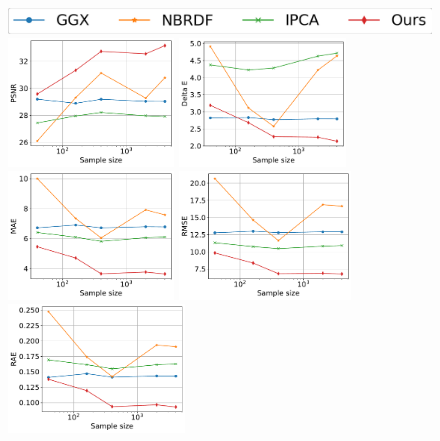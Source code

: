 \begin{figure}[t]
   \label{fig:imp_comp_upt}
\end{figure}

\begin{figure}[t]
  \centering
    {\includegraphics[width=0.35\linewidth]{Chapters/hyperbrdf-figs/legend.png}}\\
  {\includegraphics[width=0.32\linewidth, height=3.4cm]{Chapters/hyperbrdf-figs/PSNR_ggx.pdf}}
  {\includegraphics[width=0.32\linewidth, height=3.4cm]{Chapters/hyperbrdf-figs/DeltaE_ggx.pdf}}
  {\includegraphics[width=0.32\linewidth, height=3.4cm]{Chapters/hyperbrdf-figs/MAE_ggx.pdf}}
  {\includegraphics[width=0.32\linewidth, height=3.4cm]{Chapters/hyperbrdf-figs/RMSE_ggx.pdf}}
    {\includegraphics[width=0.32\linewidth, height=3.4cm]{Chapters/hyperbrdf-figs/RAE_ggx.pdf}}

\end{figure}
